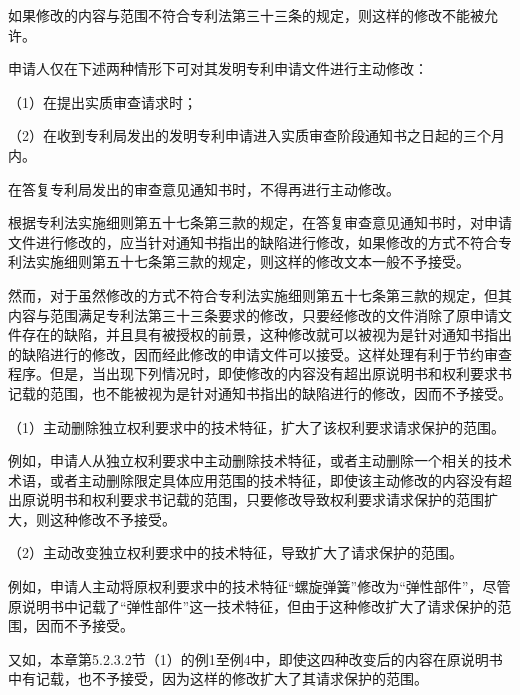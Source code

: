 如果修改的内容与范围不符合专利法第三十三条的规定，则这样的修改不能被允许。

申请人仅在下述两种情形下可对其发明专利申请文件进行主动修改：

{\setlength{\parindent}{17.1bp}（1）在提出实质审查请求时；\par}

{\setlength{\parindent}{17.1bp}（2）在收到专利局发出的发明专利申请进入实质审查阶段通知书之日起的三个月内。\par}

在答复专利局发出的审查意见通知书时，不得再进行主动修改。

根据专利法实施细则第五十七条第三款的规定，在答复审查意见通知书时，对申请文件进行修改的，应当针对通知书指出的缺陷进行修改，如果修改的方式不符合专利法实施细则第五十七条第三款的规定，则这样的修改文本一般不予接受。

然而，对于虽然修改的方式不符合专利法实施细则第五十七条第三款的规定，但其内容与范围满足专利法第三十三条要求的修改，只要经修改的文件消除了原申请文件存在的缺陷，并且具有被授权的前景，这种修改就可以被视为是针对通知书指出的缺陷进行的修改，因而经此修改的申请文件可以接受。这样处理有利于节约审查程序。但是，当出现下列情况时，即使修改的内容没有超出原说明书和权利要求书记载的范围，也不能被视为是针对通知书指出的缺陷进行的修改，因而不予接受。

{\setlength{\parindent}{17.1bp}（1）主动删除独立权利要求中的技术特征，扩大了该权利要求请求保护的范围。\par}

例如，申请人从独立权利要求中主动删除技术特征，或者主动删除一个相关的技术术语，或者主动删除限定具体应用范围的技术特征，即使该主动修改的内容没有超出原说明书和权利要求书记载的范围，只要修改导致权利要求请求保护的范围扩大，则这种修改不予接受。

{\setlength{\parindent}{17.1bp}（2）主动改变独立权利要求中的技术特征，导致扩大了请求保护的范围。\par}

例如，申请人主动将原权利要求中的技术特征“螺旋弹簧”修改为“弹性部件”，尽管原说明书中记载了“弹性部件”这一技术特征，但由于这种修改扩大了请求保护的范围，因而不予接受。

又如，本章第5.2.3.2节（1）的例1至例4中，即使这四种改变后的内容在原说明书中有记载，也不予接受，因为这样的修改扩大了其请求保护的范围。

